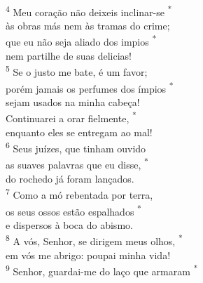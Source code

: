 \documentclass{book}
\begin{document}
\begin{center}
    \vspace{.2cm} \\
    \textsuperscript{\underline{\hspace{.07in}}\textcolor{VioletRed1}{4}} Meu coração não deixeis inclinar-se \textsuperscript{*} \\
    às obras más nem às tramas do crime;\\
    \textsuperscript{\underline{\hspace{.07in}}} que eu não seja aliado dos impios \textsuperscript{*} \\
    nem partilhe de suas delicias!
    \vspace{.2cm} \\
    \textsuperscript{\underline{\hspace{.07in}}\textcolor{VioletRed1}{5}} Se o justo me bate, é um favor; \dag{} \\
    porém jamais os perfumes dos ímpios \textsuperscript{*} \\
    sejam usados na minha cabeça! \\
    \textsuperscript{\underline{\hspace{.07in}}} Continuarei a orar fielmente, \textsuperscript{*} \\
    enquanto eles se entregam ao mal!
    \vspace{.2cm} \\
    \textsuperscript{\underline{\hspace{.07in}}\textcolor{VioletRed1}{6}} Seus juízes, que tinham ouvido  \dag{} \\
    as suaves palavras que eu disse, \textsuperscript{*} \\
    do rochedo já foram lançados. \\
    \textsuperscript{\underline{\hspace{.07in}}\textcolor{VioletRed1}{7}} Como a mó rebentada por terra, \dag{} \\
    os seus ossos estão espalhados \textsuperscript{*} \\
    e dispersos à boca do abismo.
    \vspace{.2cm} \\
    \textsuperscript{\underline{\hspace{.07in}}\textcolor{VioletRed1}{8}} A vós, Senhor, se dirigem meus olhos, \textsuperscript{*} \\
    em vós me abrigo: poupai minha vida! \\
    \textsuperscript{\underline{\hspace{.07in}}\textcolor{VioletRed1}{9}} Senhor, guardai-me do laço que armaram \textsuperscript{*} \\

\end{center}
\end{document}
